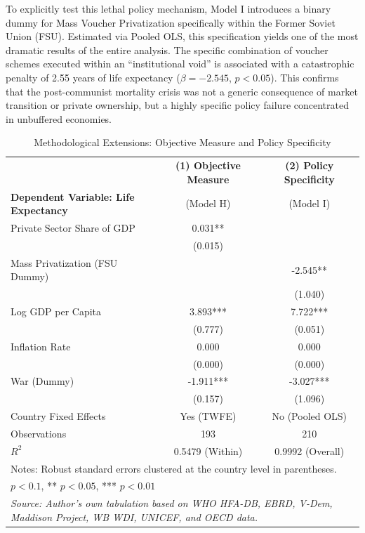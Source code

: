 \documentclass[12pt]{article}
\begin{document}
To explicitly test this lethal policy mechanism, Model I introduces a binary dummy for Mass Voucher Privatization specifically within the Former Soviet Union (FSU). Estimated via Pooled OLS, 
this specification yields one of the most dramatic results of the entire analysis. The specific combination of voucher schemes executed within an ``institutional void'' is associated with a 
catastrophic penalty of 2.55 years of life expectancy ($\beta = -2.545$, $p < 0.05$). This confirms that the post-communist mortality crisis was not a generic consequence of market transition 
or private ownership, but a highly specific policy failure concentrated in unbuffered economies.

\begin{table}[H]
\centering
\caption{Methodological Extensions: Objective Measure and Policy Specificity}
\label{tab:extensions}
\footnotesize
\begin{tabular}{l c c}
\toprule
 & \textbf{(1) Objective Measure} & \textbf{(2) Policy Specificity} \\
\textbf{Dependent Variable: Life Expectancy} & (Model H) & (Model I) \\
\midrule
Private Sector Share of GDP & 0.031** & \\
 & (0.015) & \\
Mass Privatization (FSU Dummy) & & -2.545** \\
 & & (1.040) \\
Log GDP per Capita & 3.893*** & 7.722*** \\
 & (0.777) & (0.051) \\
Inflation Rate & 0.000 & 0.000 \\
 & (0.000) & (0.000) \\
War (Dummy) & -1.911*** & -3.027*** \\
 & (0.157) & (1.096) \\
\midrule
Country Fixed Effects & Yes (TWFE) & No (Pooled OLS) \\
Observations & 193 & 210 \\
$R^2$ & 0.5479 (Within) & 0.9992 (Overall) \\
\bottomrule
\multicolumn{3}{l}{\scriptsize Notes: Robust standard errors clustered at the country level in parentheses.} \\
\multicolumn{3}{l}{\scriptsize * $p<0.1$, ** $p<0.05$, *** $p<0.01$} \\
\multicolumn{3}{l}{\scriptsize \textit{Source: Author's own tabulation based on WHO HFA-DB, EBRD, V-Dem, Maddison Project, WB WDI, UNICEF, and OECD data.}} \\
\end{tabular}
\end{table}
\end{document}
